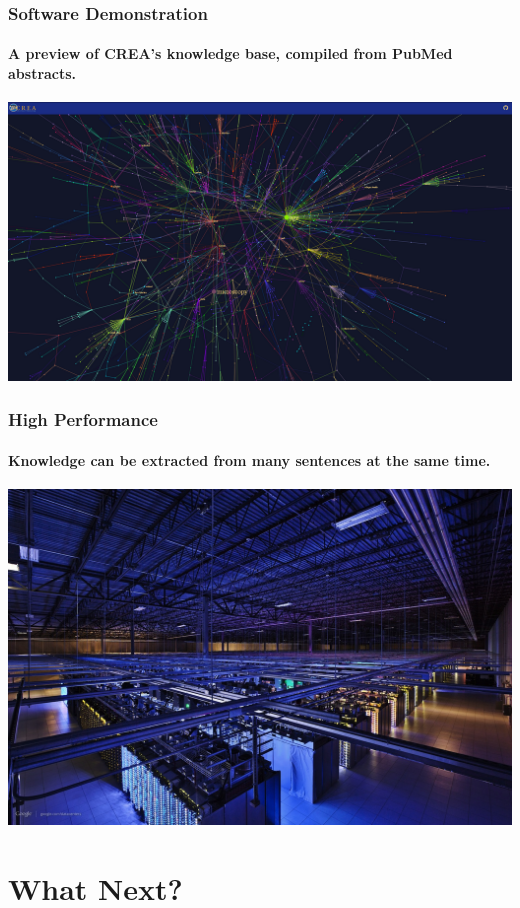 \documentclass[mathserif]{beamer}
\begin{document}
\begin{frame}

\frametitle{Software Demonstration}
\framesubtitle{A preview of CREA's knowledge base, compiled from PubMed abstracts.}

\href{http://markfarrell.ca/creal}{\includegraphics[width=1.0\linewidth]{images/results.png}}

\end{frame}

\begin{frame}

\frametitle{High Performance}
\framesubtitle{Knowledge can be extracted from many sentences at the same time.}

\includegraphics[width=1.0\linewidth]{images/parallel.jpg}

\end{frame}

\section{What Next?}
\end{document}
